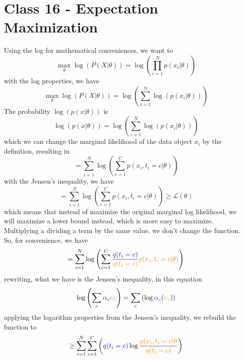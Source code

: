 \documentclass{article}
\begin{document}
\section{Class 16 - Expectation Maximization}
Using the log for mathematical conveniences, we want to
\begin{equation}
    \max_\theta \log (P(X|\theta)) = \log \left( \prod_{i=1}^N p(x_i|\theta) \right)
\end{equation}
with the log properties, we have
\begin{equation}
    \max_\theta \log (P(X|\theta)) = \log \left( \sum_{i=1}^N \log (p(x_i|\theta)) \right)
\end{equation}
The probability $\log (p(x|\theta))$ is
\begin{equation}
    \log (p(x|\theta)) = \log \left( \sum_{i=1}^N \log (p(x_i|\theta)) \right)
\end{equation}
which we can change the marginal likelihood of the data object $x_i$ by the definition, resulting in
\begin{equation}
    = \sum_{i=1}^N \log \left( \sum_{c=1}^C p(x_i, t_i = c| \theta) \right)
\end{equation}
with the Jensen's inequality, we have
\begin{equation}
    = \sum_{i=1}^N \log \left( \sum_{c=1}^C p(x_i, t_i = c| \theta) \right) \geq \mathcal{L}(\theta)
\end{equation}
which means that instead of maximize the original marginal log likelihood, we will maximize a lower bound instead, which is more easy to maximize. Multiplying a dividing a term by the same value, we don't change the function. So, for convenience, we have
\begin{equation}
    = \sum_{i=1}^N \log \left( \sum_{c=1}^C \frac{\textcolor{blue}{q(t_i = c)}}{\textcolor{orange}{q(t_i = c)}} \textcolor{orange}{p(x_i, t_i = c| \theta)} \right) 
\end{equation}
rewriting, what we have is the Jensen's inequality, in this equation
\begin{equation}
    \log \left( \sum_c \textcolor{blue}{\alpha_c}\textcolor{orange}{\upsilon_c} \right) = \sum_c \left( \log \textcolor{blue}{\alpha_c}(\textcolor{orange}{\upsilon_c}) \right)
\end{equation}
applying the logarithm properties from the Jensen's inequality, we rebuild the function to
\begin{equation}
    \geq \sum_{i=1}^N \sum_{c=1}^C \left(\textcolor{blue}{q(t_i = c)} \log\frac{\textcolor{orange}{p(x_i, t_i = c| \theta}}{\textcolor{orange}{q(t_i = c)}}  \right)
\end{equation}
\end{document}

